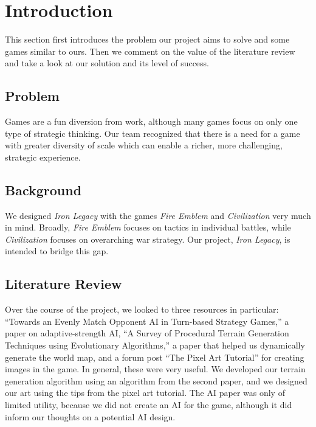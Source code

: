 \documentclass{article}
\begin{document}
\clearpage

\tableofcontents

\clearpage

\section*{Introduction}
This section first introduces the problem our project aims to solve and some
games similar to ours.
Then we comment on the value of the literature review and take a look at our
solution and its level of success.

\subsection*{Problem}
Games are a fun diversion from work, although many games focus on only one type
of strategic thinking. Our team recognized that there is a need for a game with
greater diversity of scale which can enable a richer, more challenging,
strategic experience.

\subsection*{Background}
We designed \emph{Iron Legacy} with the games 
\emph{Fire Emblem}\cite{FireEmblem} and \emph{Civilization}\cite{Civilization} 
very much in mind.
Broadly, \emph{Fire Emblem} focuses on tactics in individual battles, while
\emph{Civilization} focuses on overarching war strategy.
Our project, \emph{Iron Legacy}, is intended to bridge this gap.

\subsection*{Literature Review}
Over the course of the project, we looked to three resources in particular:
``Towards an Evenly Match Opponent AI in Turn-based Strategy Games,''\cite{AI} 
a paper on adaptive-strength AI, 
``A Survey of Procedural Terrain Generation Techniques using Evolutionary 
Algorithms,''\cite{Terrain Generation} a paper that helped us dynamically
generate the world map, and a forum post ``The Pixel Art 
Tutorial''\cite{Pixel Art} for creating images in the game.
In general, these were very useful.
We developed our terrain generation algorithm using an algorithm from the 
second paper, and we designed our art using the tips from the pixel art
tutorial.
The AI paper was only of limited utility, because we did not create an AI for
the game, although it did inform our thoughts on a potential AI design.
\end{document}
